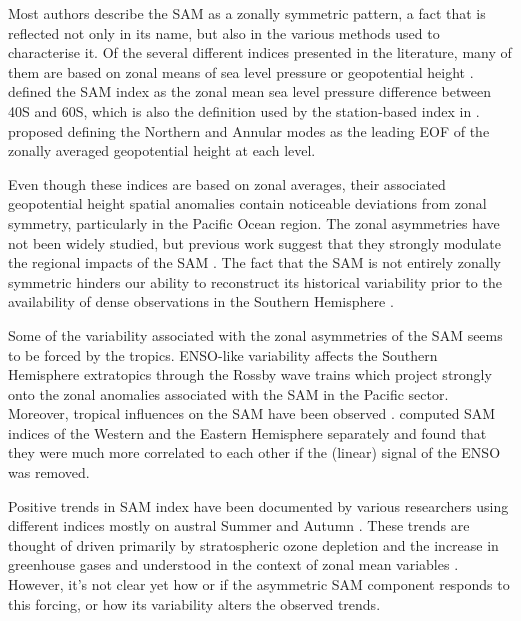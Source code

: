 \documentclass[smallextended]{svjour3}       %
\begin{document}
Most authors describe the SAM as a zonally symmetric pattern, a fact that is reflected not only in its name, but also in the various methods used to characterise it. Of the several different indices presented in the literature, many of them are based on zonal means of sea level pressure or geopotential height \citep{ho2012}. \citet{gong1999} defined the SAM index as the zonal mean sea level pressure difference between 40\degree S and 60\degree S, which is also the definition used by the station-based index in \citet{marshall2003}. \citet{baldwin2009} proposed defining the Northern and Annular modes as the leading EOF of the zonally averaged geopotential height at each level.

Even though these indices are based on zonal averages, their associated geopotential height spatial anomalies contain noticeable deviations from zonal symmetry, particularly in the Pacific Ocean region. The zonal asymmetries have not been widely studied, but previous work suggest that they strongly modulate the regional impacts of the SAM \citep{fan2007, silvestri2009, fogt2012, rosso2018}. The fact that the SAM is not entirely zonally symmetric hinders our ability to reconstruct its historical variability prior to the availability of dense observations in the Southern Hemisphere \citep{jones2009}.

Some of the variability associated with the zonal asymmetries of the SAM seems to be forced by the tropics. ENSO-like variability affects the Southern Hemisphere extratopics through the Rossby wave trains \citep{mo1987, kidson1988, karoly1989} which project strongly onto the zonal anomalies associated with the SAM in the Pacific sector. Moreover, tropical influences on the SAM have been observed \citep{fan2007, fogt2011, clem2013}. \citet{fan2007} computed SAM indices of the Western and the Eastern Hemisphere separately and found that they were much more correlated to each other if the (linear) signal of the ENSO was removed.

Positive trends in SAM index have been documented by various researchers using different indices mostly on austral Summer and Autumn \citep[e.g.][ and references therein]{fogt2020}. These trends are thought of driven primarily by stratospheric ozone depletion and the increase in greenhouse gases and understood in the context of zonal mean variables \citep{marshall2004, gillett2005, arblaster2006, gillett2013}. However, it's not clear yet how or if the asymmetric SAM component responds to this forcing, or how its variability alters the observed trends.
\end{document}

